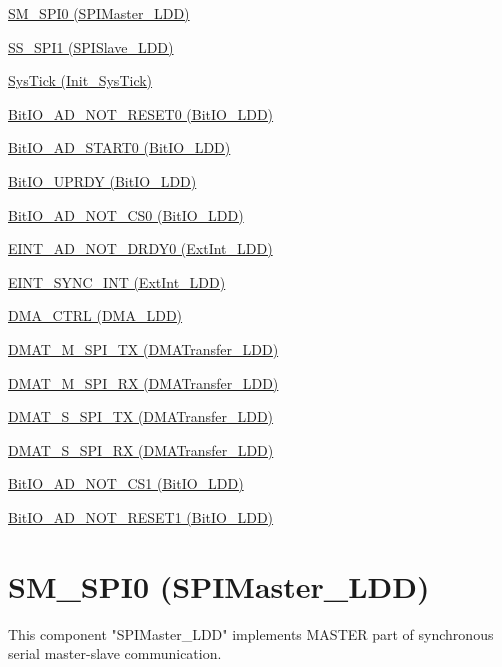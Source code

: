 
\begin{DoxyItemize}
\item \hyperlink{SM_SPI0}{S\-M\-\_\-\-S\-P\-I0 (S\-P\-I\-Master\-\_\-\-L\-D\-D)}
\item \hyperlink{SS_SPI1}{S\-S\-\_\-\-S\-P\-I1 (S\-P\-I\-Slave\-\_\-\-L\-D\-D)}
\item \hyperlink{SysTick}{Sys\-Tick (Init\-\_\-\-Sys\-Tick)}
\item \hyperlink{BitIO_AD_NOT_RESET0}{Bit\-I\-O\-\_\-\-A\-D\-\_\-\-N\-O\-T\-\_\-\-R\-E\-S\-E\-T0 (Bit\-I\-O\-\_\-\-L\-D\-D)}
\item \hyperlink{BitIO_AD_START0}{Bit\-I\-O\-\_\-\-A\-D\-\_\-\-S\-T\-A\-R\-T0 (Bit\-I\-O\-\_\-\-L\-D\-D)}
\item \hyperlink{BitIO_UPRDY}{Bit\-I\-O\-\_\-\-U\-P\-R\-D\-Y (Bit\-I\-O\-\_\-\-L\-D\-D)}
\item \hyperlink{BitIO_AD_NOT_CS0}{Bit\-I\-O\-\_\-\-A\-D\-\_\-\-N\-O\-T\-\_\-\-C\-S0 (Bit\-I\-O\-\_\-\-L\-D\-D)}
\item \hyperlink{EINT_AD_NOT_DRDY0}{E\-I\-N\-T\-\_\-\-A\-D\-\_\-\-N\-O\-T\-\_\-\-D\-R\-D\-Y0 (Ext\-Int\-\_\-\-L\-D\-D)}
\item \hyperlink{EINT_SYNC_INT}{E\-I\-N\-T\-\_\-\-S\-Y\-N\-C\-\_\-\-I\-N\-T (Ext\-Int\-\_\-\-L\-D\-D)}
\item \hyperlink{DMA_CTRL}{D\-M\-A\-\_\-\-C\-T\-R\-L (D\-M\-A\-\_\-\-L\-D\-D)}
\item \hyperlink{DMAT_M_SPI_TX}{D\-M\-A\-T\-\_\-\-M\-\_\-\-S\-P\-I\-\_\-\-T\-X (D\-M\-A\-Transfer\-\_\-\-L\-D\-D)}
\item \hyperlink{DMAT_M_SPI_RX}{D\-M\-A\-T\-\_\-\-M\-\_\-\-S\-P\-I\-\_\-\-R\-X (D\-M\-A\-Transfer\-\_\-\-L\-D\-D)}
\item \hyperlink{DMAT_S_SPI_TX}{D\-M\-A\-T\-\_\-\-S\-\_\-\-S\-P\-I\-\_\-\-T\-X (D\-M\-A\-Transfer\-\_\-\-L\-D\-D)}
\item \hyperlink{DMAT_S_SPI_RX}{D\-M\-A\-T\-\_\-\-S\-\_\-\-S\-P\-I\-\_\-\-R\-X (D\-M\-A\-Transfer\-\_\-\-L\-D\-D)}
\item \hyperlink{BitIO_AD_NOT_CS1}{Bit\-I\-O\-\_\-\-A\-D\-\_\-\-N\-O\-T\-\_\-\-C\-S1 (Bit\-I\-O\-\_\-\-L\-D\-D)}
\item \hyperlink{BitIO_AD_NOT_RESET1}{Bit\-I\-O\-\_\-\-A\-D\-\_\-\-N\-O\-T\-\_\-\-R\-E\-S\-E\-T1 (Bit\-I\-O\-\_\-\-L\-D\-D)} 
\end{DoxyItemize}\hypertarget{SM_SPI0}{}\section{S\-M\-\_\-\-S\-P\-I0 (S\-P\-I\-Master\-\_\-\-L\-D\-D)}\label{SM_SPI0}
\begin{DoxyVerb}       This component "SPIMaster_LDD" implements MASTER part of synchronous
       serial master-slave communication.
\end{DoxyVerb}



